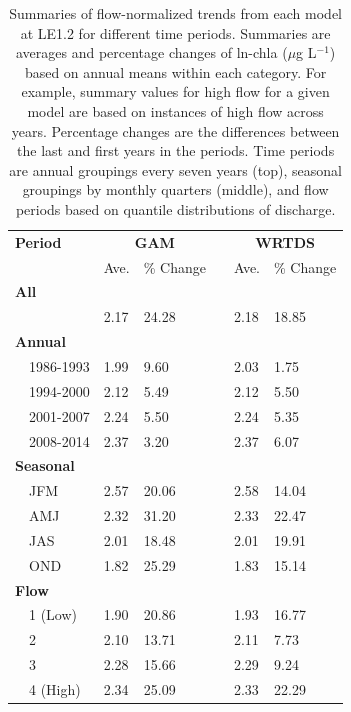 \documentclass{svjour3}\usepackage[]{graphicx}\usepackage[]{color}
\newcommand{\mugl}{$\mu$g L$^{-1}$}
\begin{document}
\begin{table}[!tbp]
\caption{Summaries of flow-normalized trends from each model at LE1.2 for different time periods.  Summaries are averages and percentage changes of ln-\ac{chla} (\mugl) based on annual means within each category.  For example, summary values for high flow for a given model are based on instances of high flow across years.  Percentage changes are the differences between the last and first years in the periods.  Time periods are annual groupings every seven years (top), seasonal groupings by monthly quarters (middle), and flow periods based on quantile distributions of discharge.\label{tab:trendsLE12}} 
\begin{center}
\begin{tabular}{lllcll}
\hline\hline
\multicolumn{1}{l}{\bfseries Period}&\multicolumn{2}{c}{\bfseries GAM}&\multicolumn{1}{c}{\bfseries }&\multicolumn{2}{c}{\bfseries WRTDS}\tabularnewline
\cline{2-3} \cline{5-6}
\multicolumn{1}{l}{}&\multicolumn{1}{c}{Ave.}&\multicolumn{1}{c}{\% Change}&\multicolumn{1}{c}{}&\multicolumn{1}{c}{Ave.}&\multicolumn{1}{c}{\% Change}\tabularnewline
\hline
{\bfseries All}&&&&&\tabularnewline
~~&2.17&24.28&&2.18&18.85\tabularnewline
\hline
{\bfseries Annual}&&&&&\tabularnewline
~~1986-1993&1.99& 9.60&&2.03& 1.75\tabularnewline
~~1994-2000&2.12& 5.49&&2.12& 5.50\tabularnewline
~~2001-2007&2.24& 5.50&&2.24& 5.35\tabularnewline
~~2008-2014&2.37& 3.20&&2.37& 6.07\tabularnewline
\hline
{\bfseries Seasonal}&&&&&\tabularnewline
~~JFM&2.57&20.06&&2.58&14.04\tabularnewline
~~AMJ&2.32&31.20&&2.33&22.47\tabularnewline
~~JAS&2.01&18.48&&2.01&19.91\tabularnewline
~~OND&1.82&25.29&&1.83&15.14\tabularnewline
\hline
{\bfseries Flow}&&&&&\tabularnewline
~~1 (Low)&1.90&20.86&&1.93&16.77\tabularnewline
~~2&2.10&13.71&&2.11& 7.73\tabularnewline
~~3&2.28&15.66&&2.29& 9.24\tabularnewline
~~4 (High)&2.34&25.09&&2.33&22.29\tabularnewline
\hline
\end{tabular}\end{center}

\end{table}
\end{document}
